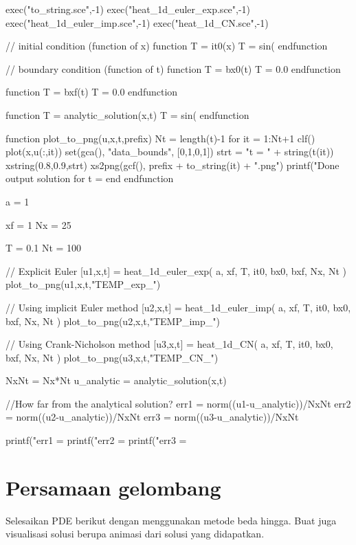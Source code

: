 \documentclass[10pt,bahasa]{article}
\begin{document}
\begin{scilabcode}
exec("to_string.sce",-1)
exec("heat_1d_euler_exp.sce",-1)
exec("heat_1d_euler_imp.sce",-1)
exec("heat_1d_CN.sce",-1)

// initial condition (function of x)
function T = it0(x)
  T = sin(%
endfunction

// boundary condition (function of t)
function T = bx0(t)
  T = 0.0
endfunction

function T = bxf(t)
  T = 0.0
endfunction

function T = analytic_solution(x,t)
  T = sin(%
endfunction

function plot_to_png(u,x,t,prefix)
  Nt = length(t)-1
  for it = 1:Nt+1
    clf()
    plot(x,u(:,it))
    set(gca(), "data_bounds", [0,1,0,1])
    strt = "t = " + string(t(it))
    xstring(0.8,0.9,strt)
    xs2png(gcf(), prefix + to_string(it) + ".png")
    printf("Done output solution for t = %
  end
endfunction

a = 1

xf = 1
Nx = 25

T  = 0.1
Nt = 100

// Explicit Euler
[u1,x,t] = heat_1d_euler_exp( a, xf, T, it0, bx0, bxf, Nx, Nt )
plot_to_png(u1,x,t,"TEMP_exp_")

// Using implicit Euler method
[u2,x,t] = heat_1d_euler_imp( a, xf, T, it0, bx0, bxf, Nx, Nt )
plot_to_png(u2,x,t,"TEMP_imp_")

// Using Crank-Nicholson method
[u3,x,t] = heat_1d_CN( a, xf, T, it0, bx0, bxf, Nx, Nt )
plot_to_png(u3,x,t,"TEMP_CN_")

NxNt = Nx*Nt
u_analytic = analytic_solution(x,t)

//How far from the analytical solution?
err1 = norm((u1-u_analytic))/NxNt
err2 = norm((u2-u_analytic))/NxNt
err3 = norm((u3-u_analytic))/NxNt

printf("err1 = %
printf("err2 = %
printf("err3 = %
\end{scilabcode}


\section{Persamaan gelombang}

Selesaikan PDE berikut dengan menggunakan metode beda hingga.
Buat juga visualisasi solusi berupa animasi dari solusi yang didapatkan.
\end{document}
